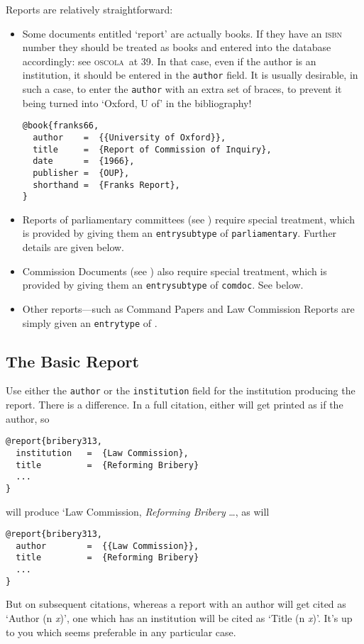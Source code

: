 \documentclass[a4paper,
               11pt,
	       DIV=1,			   
	       footinclude=false]
	      {scrartcl}
\newcommand{\oscolashort}{\textsc{oscola}\nocite{oscola}}
\newcounter{egcounter}\setcounter{egcounter}{0}
\newlength{\boxwidth}
\newenvironment{bibexample}[1][]
{%
  \medskip\par\noindent\ignorespaces
  \marginpar{[\refstepcounter{egcounter}\arabic{egcounter}]\label{#1}}%
  \setlength{\boxwidth}{0.95\linewidth}%
  \addtolength{\boxwidth}{-2\fboxsep}
  \addtolength{\boxwidth}{-2\fboxrule}
  \begin{lrbox}{\boxcontainer}
  \begin{minipage}[t]{\boxwidth}%
}
{%
  \end{minipage}\end{lrbox}%
  \colorbox{gray!30}{\usebox{\boxcontainer}}
  \par\medskip}
\begin{document}
Reports are relatively straightforward:
\begin{itemize}
\item Some documents entitled `report' are actually books. If they
  have an \textsc{isbn} number they should be treated as books and
  entered into the database accordingly: see \oscolashort\ at
  39. In that case, even if the author is an institution, it should be
  entered in the \texttt{author} field. It is usually desirable, in
  such a case, to enter the \texttt{author} with an extra set of
  braces, to prevent it being turned into `Oxford, U of' in the bibliography!
\begin{bibexample}[franks66]
\begin{verbatim}
@book{franks66,
  author    =  {{University of Oxford}},
  title     =  {Report of Commission of Inquiry},
  date      =  {1966},
  publisher =  {OUP},
  shorthand =  {Franks Report},
}
\end{verbatim}
\end{bibexample}
\item Reports of parliamentary committees (see \cite[40]{oscola})
  require special treatment, which is provided by giving them an
  \texttt{entrysubtype} of \texttt{parliamentary}. Further details are
  given below.
\item Commission Documents (see \cite[41]{oscola}) also require
special treatment, which is provided by giving them an
\texttt{entrysubtype} of \texttt{comdoc}. See below.
\item Other reports---such as Command Papers and Law Commission
  Reports are simply given an \texttt{entrytype} of \texttt{\@report}. 
\end{itemize}

\subsection{The Basic Report}

Use either the \texttt{author} or the \texttt{institution} field for
the institution producing the report. There is a difference. In a full
citation, either will get printed as if the author, so
\begin{verbatim}
@report{bribery313,
  institution   =  {Law Commission},
  title         =  {Reforming Bribery}
  ...
}
\end{verbatim}
will produce `Law Commission, \emph{Reforming Bribery} \ldots, as will
\begin{verbatim}
@report{bribery313,
  author        =  {{Law Commission}},
  title         =  {Reforming Bribery}
  ...
}
\end{verbatim}
But on subsequent citations, whereas a report with an author will get
cited as `Author (n \emph{x})', one which has an institution will be
cited as `Title (n \emph{x})'. It's up to you which seems preferable
in any particular case.
\end{document}
